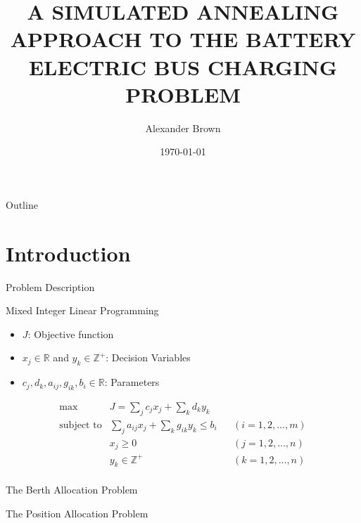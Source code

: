 \documentclass[bigger]{beamer}
\author{Alexander Brown}
\date{\today}
\title{A SIMULATED ANNEALING APPROACH TO THE BATTERY ELECTRIC BUS CHARGING PROBLEM}
\begin{document}
\maketitle
\begin{frame}{Outline}
\tableofcontents
\end{frame}


\section{Introduction}
\label{sec:org1b24747}
\begin{frame}[label={sec:org1d252b8}]{Problem Description}
\end{frame}
\begin{frame}[label={sec:orgd781c09}]{Mixed Integer Linear Programming}
\begin{itemize}
\item \(J\): Objective function
\item \(x_j \in \mathbb{R}\) and \(y_k \in \mathbb{Z}^+\): Decision Variables
\item \(c_j, d_k, a_{ij}, g_{ik}, b_i \in \mathbb{R}\): Parameters
\end{itemize}

\begin{subequations}
\label{eq:milp-structure}
\begin{align}
&\text{max}        &J = \sum_j c_j x_j + \sum_k d_k y_k&         &               &\label{eq:fuzzy-milp-objective}\\
&\text{subject to} &\sum_j a_{ij} x_j + \sum_k g_{ik} y_k \le b_i&  &(i = 1,2,...,m)& \label{eq:fuzzy-milp-constraint}\\
&                  &x_j \ge 0&                              &(j = 1,2,...,n)& \label{eq:fuzzy-milp-continuous}\\
&                  &y_k \in \mathbb{Z^+}&                   &(k = 1,2,...,n)& \label{eq:fuzzy-milp-integer}\\
&\end{align}
\end{subequations}
\end{frame}
\begin{frame}[label={sec:org8c75753}]{The Berth Allocation Problem}
\end{frame}
\begin{frame}[label={sec:org088f08b}]{The Position Allocation Problem}
\end{frame}
\end{document}
